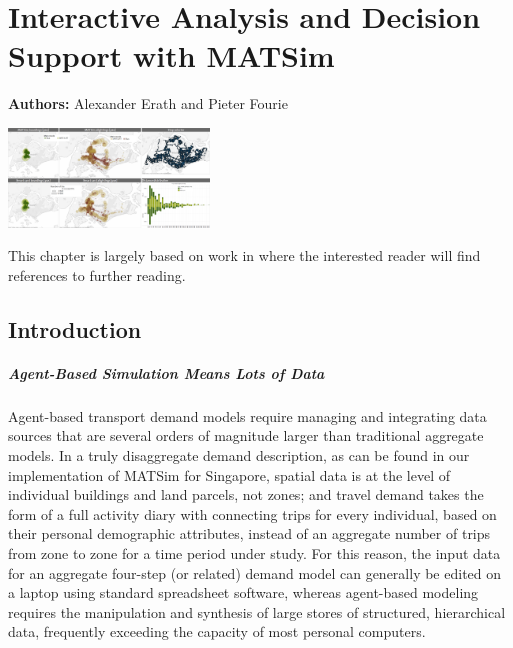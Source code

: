 \chapter{Interactive Analysis and Decision Support with MATSim}
\label{ch:businessanalytics}

\hfill \textbf{Authors:} Alexander Erath and Pieter Fourie

\begin{center} \includegraphics[width=0.4\textwidth, angle=0]{extending/figures/businessanalytics/tableau.png} \end{center}

This chapter is largely based on work in \citet[][]{ErathEtAl_EASTS_2013} where the interested reader will find references to further reading.
\section{Introduction}
\label{sec:analyticsIntro}
\paragraph{Agent-Based Simulation Means Lots of Data}
Agent-based transport demand models require managing and integrating data sources that are several orders of magnitude larger than traditional aggregate models. In a truly disaggregate demand description, as can be found in our implementation of MATSim for Singapore, spatial data is at the level of individual buildings and land parcels, not zones; and travel demand takes the form of a full activity diary with connecting trips for every individual, based on their personal demographic attributes, instead of an aggregate number of trips from zone to zone for a time period under study. For this reason, the input data for an aggregate four-step (or related) demand model can generally be edited on a laptop using standard spreadsheet software, whereas agent-based modeling requires the manipulation and synthesis of large stores of structured, hierarchical data, frequently exceeding the capacity of most personal computers.

